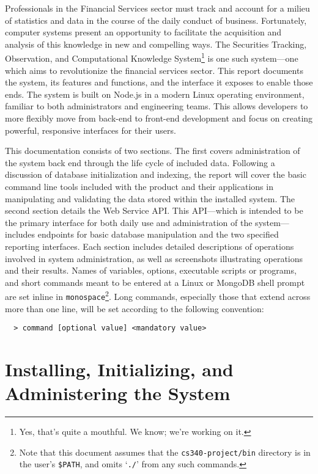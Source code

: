 \documentclass[
11pt,
titlepage,
]{article}
\begin{document}


Professionals in the Financial Services sector must track and account for a
milieu of statistics and data in the course of the daily conduct of business.
Fortunately, computer systems present an opportunity to facilitate the
acquisition and analysis of this knowledge in new and compelling ways. The
Securities Tracking, Observation, and Computational Knowledge
System\footnote{Yes, that's quite a mouthful. We know; we're working on it.} is
one such system---one which aims to revolutionize the financial services sector.
This report documents the system, its features and functions, and the interface
it exposes to enable those ends. The system is built on Node.js in a modern
Linux operating environment, familiar to both administrators and engineering
teams. This allows developers to more flexibly move from back-end to front-end
development and focus on creating powerful, responsive interfaces for their
users.

This documentation consists of two sections. The first covers administration of
the system back end through the life cycle of included data. Following a
discussion of database initialization and indexing, the report will cover the
basic command line tools included with the product and their applications in
manipulating and validating the data stored within the installed system. The
second section details the Web Service API. This API---which is intended to be
the primary interface for both daily use and administration of the
system---includes endpoints for basic database manipulation and the two
specified reporting interfaces. Each section includes detailed descriptions of
operations involved in system administration, as well as screenshots
illustrating operations and their results. Names of variables, options,
executable scripts or programs, and short commands meant to be entered at a
Linux or MongoDB shell prompt are set inline in
\texttt{monospace}\footnote{Note that this document assumes that the
\texttt{cs340-project/bin} directory is in the user's \texttt{\$PATH}, and omits
`\texttt{./}' from any such commands.}. Long
commands, especially those that extend across more than one line, will be set
according to the following convention:

\begin{lstlisting}
  > command [optional value] <mandatory value>
\end{lstlisting}

\section{Installing, Initializing, and Administering the System}
\end{document}
